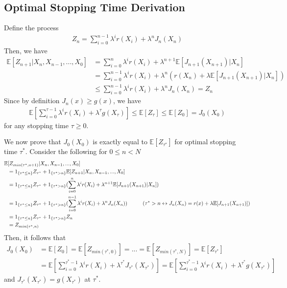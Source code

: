 \begin{appendices}
\chapter{Optimal Stopping Time Derivation}\label{thm:ost}
Define the process
\begin{align*}
	Z_n = \sum_{i=0}^{n-1} \lambda^ir(X_i) + \lambda^nJ_n(X_n)
\end{align*}
Then, we have
\begin{align*}
	\mathbb{E}[Z_{n+1} \vert X_n, X_{n-1}, ..., X_0] &= \sum_{i=0}^n \lambda^ir(X_i) + \lambda^{n+1}\mathbb{E}[J_{n+1}(X_{n+1})\vert X_n]\\
	&= \sum_{i=0}^{n-1} \lambda^ir(X_i) + \lambda^n(r(X_n) + \lambda\mathbb{E}[J_{n+1}(X_{n+1})\vert X_n])\\
	&\leq \sum_{i=0}^{n-1} \lambda^i r(X_i) + \lambda^nJ_n(X_n) = Z_n
\end{align*}
Since by definition $J_n(x) \geq g(x)$, we have
\begin{align*}
	\mathbb{E}[\sum_{i=0}^{\tau-1}\lambda^ir(X_i) + \lambda^{\tau}g(X_{\tau})] \leq \mathbb{E}[Z_{\tau}] \leq \mathbb{E}[Z_0] = J_0(X_0)
\end{align*}
for any stopping time $\tau \geq 0$. 

We now prove that $J_0(X_0)$ is exactly equal to $\mathbb{E}[Z_{\tau^*}]$ for optimal stopping time $\tau^*$. Consider the following for $0 \leq n < N$
\begin{align*}
	\mathbb{E}&[Z_{min(\tau^*, n+1)}\vert X_n, X_{n-1}, ..., X_0]\\
	&= 1_{\{\tau^* \leq n\}}Z_{\tau^*} + 1_{\{\tau^* > n\}}\mathbb{E}[Z_{n+1}\vert X_n, X_{n-1}, ..., X_0]\\
	&= 1_{\{\tau^* \leq n\}}Z_{\tau^*} + 1_{\{\tau^* > n\}}(\sum_{i=0}^n \lambda^ir(X_i) + \lambda^{n+1}\mathbb{E}[J_{n+1}(X_{n+1})\vert X_n])\\
	&= 1_{\{\tau^* \leq n\}}Z_{\tau^*} + 1_{\{\tau^* > n\}}(\sum_{i=0}^{n-1} \lambda^ir(X_i) + \lambda^nJ_n(X_n)) \hspace*{1cm} (\tau^* > n\leftrightarrow J_n(X_n) = r(x) + \lambda\mathbb{E}[J_{n+1}(X_{n+1})])\\ 
	&= 1_{\{\tau^* \leq n\}}Z_{\tau^*} + 1_{\{\tau^* > n\}}Z_{n}\\
	&= Z_{min(\tau^*, n)}
\end{align*}
Then, it follows that
\begin{align*}
	J_0(X_0) &= \mathbb{E}[Z_0] = \mathbb{E}[Z_{min(\tau^*, 0)}] = ... = \mathbb{E}[Z_{min(\tau^*, N)}] = \mathbb{E}[Z_{\tau^*}]\\
			 &= \mathbb{E}[\sum_{i=0}^{\tau^* -1}\lambda^ir(X_i) + \lambda^{\tau^*}J_{\tau^*}(X_{\tau^*})] = \mathbb{E}[\sum_{i=0}^{\tau^* -1}\lambda^ir(X_i) + \lambda^{\tau^*}g(X_{\tau^*})]
\end{align*}
and $J_{\tau^*}(X_{\tau^*}) = g(X_{\tau^*})$ at $\tau^*$.
\end{appendices}
